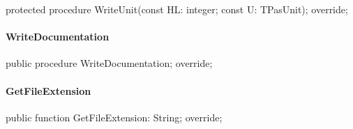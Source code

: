 \documentclass{report}
\newif\ifpdf
\begin{document}
\label{PasDoc_GenPHP.TPHPDocGenerator-WriteUnit}
\begin{list}{}{
\setlength{\itemindent}{0cm}
\setlength{\listparindent}{0cm}
\setlength{\leftmargin}{\evensidemargin}
\addtolength{\leftmargin}{\tmplength}
\settowidth{\labelsep}{X}
\addtolength{\leftmargin}{\labelsep}
\setlength{\labelwidth}{\tmplength}
}
\item[\textbf{Declaration}\hfill]
\ifpdf
\begin{flushleft}
\fi
\begin{ttfamily}
protected procedure WriteUnit(const HL: integer; const U: TPasUnit); override;\end{ttfamily}

\ifpdf
\end{flushleft}
\fi

\end{list}
\paragraph*{WriteDocumentation}\hspace*{\fill}

\label{PasDoc_GenPHP.TPHPDocGenerator-WriteDocumentation}
\begin{list}{}{
\setlength{\itemindent}{0cm}
\setlength{\listparindent}{0cm}
\setlength{\leftmargin}{\evensidemargin}
\addtolength{\leftmargin}{\tmplength}
\settowidth{\labelsep}{X}
\addtolength{\leftmargin}{\labelsep}
\setlength{\labelwidth}{\tmplength}
}
\item[\textbf{Declaration}\hfill]
\ifpdf
\begin{flushleft}
\fi
\begin{ttfamily}
public procedure WriteDocumentation; override;\end{ttfamily}

\ifpdf
\end{flushleft}
\fi

\end{list}
\paragraph*{GetFileExtension}\hspace*{\fill}

\label{PasDoc_GenPHP.TPHPDocGenerator-GetFileExtension}
\begin{list}{}{
\setlength{\itemindent}{0cm}
\setlength{\listparindent}{0cm}
\setlength{\leftmargin}{\evensidemargin}
\addtolength{\leftmargin}{\tmplength}
\settowidth{\labelsep}{X}
\addtolength{\leftmargin}{\labelsep}
\setlength{\labelwidth}{\tmplength}
}
\item[\textbf{Declaration}\hfill]
\ifpdf
\begin{flushleft}
\fi
\begin{ttfamily}
public function GetFileExtension: String; override;\end{ttfamily}

\ifpdf
\end{flushleft}
\fi

\end{list}
\end{document}
